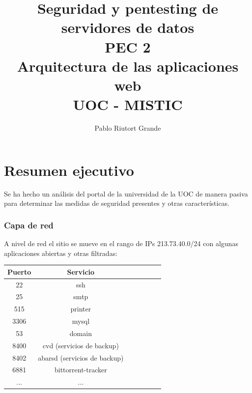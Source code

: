 \documentclass[10pt,a4paper]{article}
\author{Pablo Riutort Grande}
\title{
	Seguridad y pentesting de servidores de datos\\
	\vspace{0.5cm}
	PEC 2\\
	\vspace{1cm}
	\textbf{Arquitectura de las aplicaciones web}
	\vspace{1cm}\\UOC - MISTIC
}
\begin{document}
\maketitle
\pagebreak
\tableofcontents
\listoffigures
\pagebreak

\section{Resumen ejecutivo}

Se ha hecho un análisis del portal de la universidad de la UOC de manera pasiva para determinar las medidas de seguridad presentes y otras características.

\subsubsection{Capa de red}
A nivel de red el sitio se mueve en el rango de IPs 213.73.40.0/24 con algunas aplicaciones abiertas y otras filtradas:

\begin{center}
\begin{tabular}{|c|c|c|c|c|c|c|}
\hline 
 \textbf{Puerto} & \textbf{Servicio} \\ 
\hline 
 22 & ssh \\ 
\hline 
 25 & smtp \\ 
\hline 
 515 & printer \\ 
\hline 
 3306 & mysql \\ 
\hline 
 53 & domain \\ 
\hline 
 8400 & cvd (servicios de backup)\\ 
\hline 
 8402 & abarsd (servicios de backup)\\ 
\hline
 6881 & bittorrent-tracker \\
\hline 
 ... & ... \\
\hline 
\end{tabular} 
\end{center}
\end{document}
